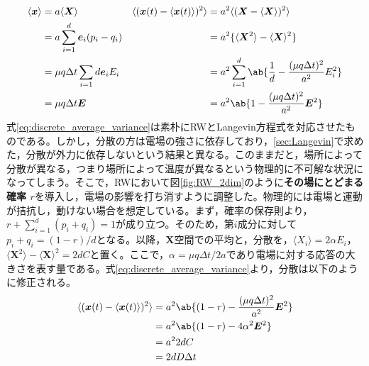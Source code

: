 \documentclass[autodetect-engine,dvi=dvipdfmx,a4paper,ja=standard,oneside,openany,11pt,draft]{bxjsbook}
\begin{document}
\begin{equation}
  \begin{aligned}
    \langle\bm{x}\rangle & =a\langle\bm{X}\rangle                    & \langle(\bm{x}(t)-\langle\bm{x}(t)\rangle)^2\rangle & =a^2\langle(\bm{X}-\langle\bm{X}\rangle)^2\rangle                        \\
                         & =a\sum_{i=1}^{d}\bm{e}_i(p_i-q_i)         &                                                     & =a^2\{\langle\bm{X}^2\rangle-\langle\bm{X}\rangle^2\}                    \\
                         & =\mu q \Delta t\sum_{i=1}{d} \bm{e}_i E_i &                                                     & =a^2\sum_{i=1}^{d}\ab\{\frac{1}{d}-\frac{(\mu q \Delta t)^2}{a^2}E_i^2\} \\
                         & =\mu q \Delta t\bm{E}                     &                                                     & =a^2\ab\{1-\frac{(\mu q \Delta t)^2}{a^2}\bm{E}^2\}                      \\
  \end{aligned}
  \label{eq:discrete_average_variance}
\end{equation}
式\ref{eq:discrete_average_variance}は素朴にRWとLangevin方程式を対応させたものである。しかし，分散の方は電場の強さに依存しており，\ref{sec:Langevin}で求めた，分散が外力に依存しないという結果と異なる。このままだと，場所によって分散が異なる，つまり場所によって温度が異なるという物理的に不可解な状況になってしまう。そこで，RWにおいて図\ref{fig:RW_2dim}のように\textbf{その場にとどまる確率 $r$}を導入し，電場の影響を打ち消すように調整した。物理的には電場と運動が拮抗し，動けない場合を想定している。まず，確率の保存則より，$r+\sum_{i=1}^{d}(p_i+q_i) =1$が成り立つ。そのため，第$i$成分に対して$p_i+q_i=(1-r)/d$となる。以降，$\bm{X}$空間での平均と，分散を，$\langle X_i\rangle=2\alpha E_i$，$\langle\bm{X}^2\rangle-\langle\bm{X}\rangle^2=2dC$と置く。ここで，$\alpha=\mu q\Delta t/2a$であり電場に対する応答の大きさを表す量である。式\ref{eq:discrete_average_variance}より，分散は以下のように修正される。
\begin{equation}
  \begin{split}
    \langle(\bm{x}(t)-\langle\bm{x}(t)\rangle)^2\rangle & =a^2\ab\{(1-r)-\frac{(\mu q \Delta t)^2}{a^2}\bm{E}^2\} \\
                                                        & =a^2\ab\{(1-r)-4\alpha^2\bm{E}^2\}                      \\
                                                        & =a^2 2dC                                                \\
                                                        & =2dD\Delta t
  \end{split}
  \label{eq:discrete_variance}
\end{equation}
\end{document}
